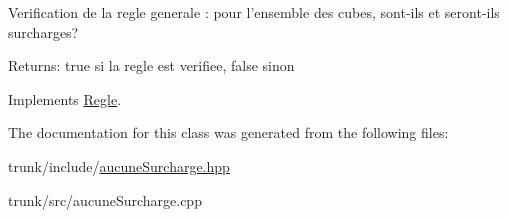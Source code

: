 Verification de la regle generale : pour l'ensemble des cubes, sont-ils et seront-ils surcharges? 

\begin{Desc}
\item[Returns:]true si la regle est verifiee, false sinon \end{Desc}


Implements \hyperlink{classRegle_4b3de9a64ec0e948e9177026afcc073d}{Regle}.

The documentation for this class was generated from the following files:\begin{CompactItemize}
\item 
trunk/include/\hyperlink{aucuneSurcharge_8hpp}{aucuneSurcharge.hpp}\item 
trunk/src/aucuneSurcharge.cpp\end{CompactItemize}
